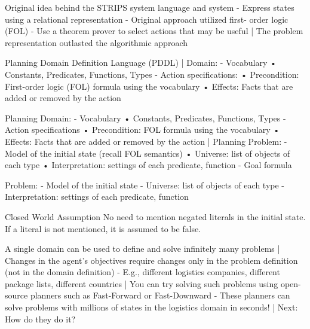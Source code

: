 \documentclass[10pt]{article}
\begin{document}
Original idea behind the STRIPS system language and system
- Express states using a relational representation
- Original approach utilized first- order logic (FOL)
- Use a theorem prover to select actions that may be useful
| The problem representation outlasted the algorithmic approach





Planning Domain Definition Language (PDDL)
| Domain:
- Vocabulary
• Constants, Predicates, Functions, Types
- Action specifications:
• Precondition: First-order logic (FOL)
formula using the vocabulary
• Effects: Facts that are added or removed by the action

Planning Domain: - Vocabulary
• Constants, Predicates, Functions, Types
- Action specifications
• Precondition: FOL formula using the vocabulary
• Effects: Facts that are added or removed by the action
| Planning Problem:
- Model of the initial state (recall FOL semantics)
• Universe: list of objects of each type
• Interpretation: settings of each predicate, function
- Goal formula

Problem:
- Model of the initial state
- Universe: list of objects of each type
- Interpretation: settings of each predicate, function

Closed World Assumption
No need to mention negated literals in the initial state.
If a literal is not mentioned, it is assumed to be false.

A single domain can be used to define and solve infinitely many problems
| Changes in the agent’s objectives require changes only in the problem definition (not in the domain definition)
- E.g., different logistics companies, different package lists, different countries
| You can try solving such problems using open-source planners such as Fast-Forward or Fast-Downward
- These planners can solve problems with millions of states in the logistics domain in seconds!
| Next: How do they do it?
\end{document}
